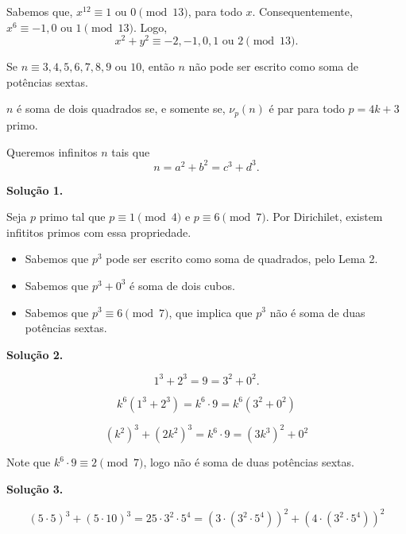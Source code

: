 \documentclass[10pt, a4paper]{article}
\begin{document}
	
	\setcounter{prob}{8}
	
	Sabemos que, $x^{12} \equiv 1 \text{ ou } 0 \pmod{13}$, para todo $x$. Consequentemente, $x^{6} \equiv -1, 0 \text{ ou } 1 \pmod{13}$. Logo, \[x^2 + y^2 \equiv -2, -1, 0, 1 \text{ ou } 2 \pmod{13}.\]

	\begin{lem}
		Se $n \equiv 3, 4, 5, 6, 7, 8, 9 \text{ ou } 10$, então $n$ não pode ser escrito como soma de potências sextas.
	\end{lem}

	\begin{lem}
		$n$ é soma de dois quadrados se, e somente se, $\nu_p(n)$ é par para todo $p = 4k + 3$ primo.
	\end{lem}

	Queremos infinitos $n$ tais que \[ n = a^2 + b^2 = c^3 + d^3. \]

	\textbf{Solução 1.}

	Seja $p$ primo tal que $p \equiv 1 \pmod{4}$ e $p \equiv 6 \pmod{7}$. Por Dirichilet, existem infititos primos com essa propriedade.

	\begin{itemize}
		\item Sabemos que $p^3$ pode ser escrito como soma de quadrados, pelo Lema 2.
		\item Sabemos que $p^3 + 0^3$ é soma de dois cubos.
		\item Sabemos que $p^3 \equiv 6 \pmod{7}$, que implica que $p^3$ não é soma de duas potências sextas. 
	\end{itemize}

	\textbf{Solução 2.}

	\[1^3 + 2^3 = 9 = 3^2 + 0^2.\]

	\[k^6 (1^3 + 2^3) = k^6 \cdot 9 = k^6 (3^2 + 0^2)\]

	\[(k^2)^3 + (2 k^2)^3 = k^6 \cdot 9 = (3 k^3)^2 + 0^2\]

	Note que $k^6 \cdot 9 \equiv 2 \pmod{7}$, logo não é soma de duas potências sextas.

	\textbf{Solução 3.}

	\[ (5\cdot 5)^3 + (5 \cdot 10)^3 = 25 \cdot 3^2 \cdot 5^4 = (3 \cdot (3^2 \cdot 5^4))^2 + (4 \cdot (3^2 \cdot 5^4))^2 \]
\end{document}

